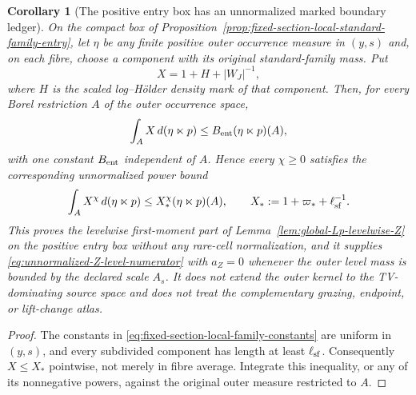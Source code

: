 \documentclass[11pt]{article}
\newtheorem{corollary}[theorem]{Corollary}
\begin{document}
\begin{corollary}[The positive entry box has an unnormalized marked
boundary ledger]
\label{cor:fixed-section-local-aggregate-Z}
On the compact box of
Proposition~\ref{prop:fixed-section-local-standard-family-entry}, let
$\eta$ be any finite positive outer occurrence measure in $(y,s)$ and, on
each fibre, choose a component with its original standard-family mass.  Put
\[
 X=1+H+|W_J|^{-1},
\]
where $H$ is the scaled log--H\"older density mark of that component.  Then,
for every Borel restriction $A$ of the outer occurrence space,
\begin{equation}
\label{eq:fixed-section-local-aggregate-Z}
 \int_A X\,d(\eta\ltimes p)
 \le B_{\rm ent}(\eta\ltimes p)(A),
\end{equation}
with one constant $B_{\rm ent}$ independent of $A$.  Hence every
$\chi\ge0$ satisfies the corresponding unnormalized power bound
\[
 \int_A X^\chi\,d(\eta\ltimes p)
 \le X_*^\chi(\eta\ltimes p)(A),\qquad
 X_*:=1+\varpi_*+\ell_{\rm sf}^{-1}.
\]
This proves the levelwise first-moment part of
Lemma~\ref{lem:global-Lp-levelwise-Z} on the positive entry box without any
rare-cell normalization, and it supplies
\eqref{eq:unnormalized-Z-level-numerator} with $a_Z=0$ whenever the outer
level mass is bounded by the declared scale $A_s$.  It does not extend the
outer kernel to the
TV-dominating source space and does not treat the complementary grazing,
endpoint, or lift-change atlas.
\end{corollary}

\begin{proof}
The constants in
\eqref{eq:fixed-section-local-family-constants} are uniform in $(y,s)$,
and every subdivided component has length at least $\ell_{\rm sf}$.
Consequently $X\le X_*$ pointwise, not merely in fibre average.  Integrate
this inequality, or any of its nonnegative powers, against the original
outer measure restricted to $A$.
\end{proof}
\end{document}
